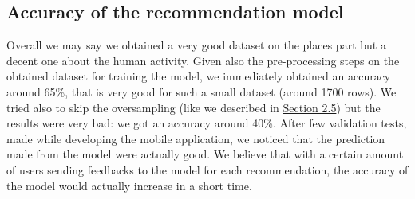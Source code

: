 \documentclass[../../main]{subfiles}
\begin{document}
\subsection{Accuracy of the recommendation model}
\label{ss:accuracy-recommendation-model}

Overall we may say we obtained a very good dataset on the places part but a decent one about the human activity.
Given also the pre-processing steps on the obtained dataset for training the model, we immediately obtained an accuracy around 65\%, that is very good for such a small dataset (around 1700 rows).
We tried also to skip the oversampling (like we described in \hyperref[ss:recommendation-model]{Section 2.5}) but the results were very bad: we got an accuracy around 40\%.
After few validation tests, made while developing the mobile application, we noticed that the prediction made from the model were actually good.
We believe that with a certain amount of users sending feedbacks to the model for each recommendation, the accuracy of the model would actually increase in a short time.
\end{document}
